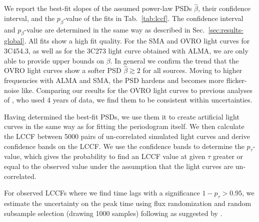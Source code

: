 \documentclass[twocolumn,linenumbers]{aastex62}
\begin{document}
We report the best-fit slopes of the assumed power-law PSDs $\hat{\beta}$, their confidence interval, and the $p_\beta$-value of the fits in Tab.~\ref{tab:lccf}.
The confidence interval and $p_\beta$-value are determined in the same way as described in Sec.~\ref{sec:results-global}.
All fits show a high fit quality. 
For the SMA and OVRO light curves for 3C454.3, as well as for the 3C273 light curve obtained with ALMA, we are only able to provide upper bounds on $\beta$.
In general we confirm the trend that the OVRO light curves show a softer PSD $\hat{\beta} \gtrsim 2$ for all sources. 
Moving to higher frequencies with ALMA and SMA, the PSD hardens and becomes more flicker-noise like. 
Comparing our results for the OVRO light curves to previous analyses of \citet{2014MNRAS.445..428M}, who used 4 years of data, we find them to be consistent within uncertainties. 

Having determined the best-fit PSDs, we use them it to create artificial light curves in the same way as for fitting the periodogram itself.
We then calculate the LCCF between 5000 pairs of un-correlated simulated light curves and derive confidence bands on the LCCF. We use the confidence bands to determine the $p_\tau$-value, which gives the probability to find an LCCF value at given $\tau$ greater or equal to the observed value under the assumption that the light curves are un-correlated. 

For observed LCCFs where we find time lags with a significance $1 - p_\tau > 0.95$, we estimate the uncertainty on the peak time using flux randomization and random subsample selection (drawing 1000 samples) following \citet{1998PASP..110..660P} as suggested by \citet{2014MNRAS.445..437M}.
\end{document}
